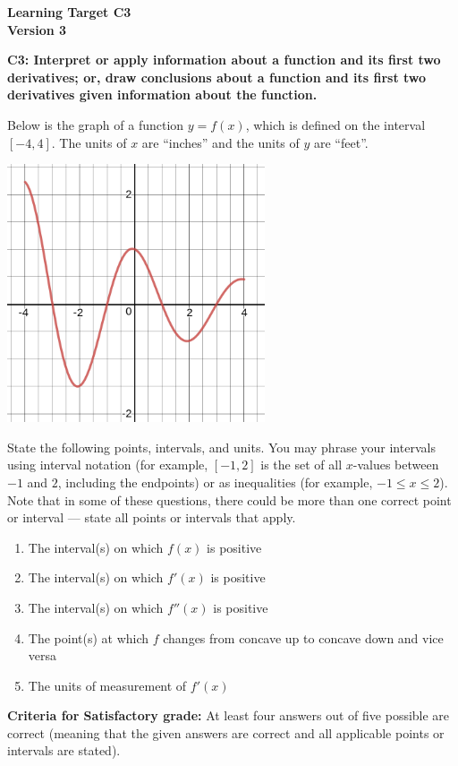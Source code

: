 \documentclass[10pt]{article}
\begin{document}
	\vspace*{0in}

		\begin{center}
			\textbf{Learning Target C3 \\
			Version 3} \\
		\end{center}


\begin{framed}
	\textbf{C3: Interpret or apply information about a function and its first two derivatives; or, draw conclusions about a function and its first two derivatives given information about the function. }
\end{framed}

Below is the graph of a function $y = f(x)$, which is defined on the interval $[-4,4]$. The units of $x$ are ``inches'' and the units of $y$ are ``feet''. 
\begin{center}
    \includegraphics[width=3in]{ltc3-v3.png}
\end{center}
State the following points, intervals, and units. You may phrase your intervals using interval notation (for example, $[-1,2]$ is the set of all $x$-values between $-1$ and $2$, including the endpoints) or as inequalities (for example, $-1 \leq x \leq 2$). Note that in some of these questions, there could be more than one correct point or interval --- state all points or intervals that apply. 

\begin{enumerate}
    \item The interval(s) on which $f(x)$ is positive
    \item The interval(s) on which $f'(x)$ is positive
    \item The interval(s) on which $f''(x)$ is positive
    \item The point(s) at which $f$ changes from concave up to concave down and vice versa
    \item The units of measurement of $f'(x)$
\end{enumerate}


\vfill


\begin{small}
    \begin{framed}
        	\textbf{Criteria for Satisfactory grade:} At least four answers out of five possible are correct (meaning that the given answers are correct and all applicable points or intervals are stated). 
    \end{framed}

\end{small}
\end{document}
